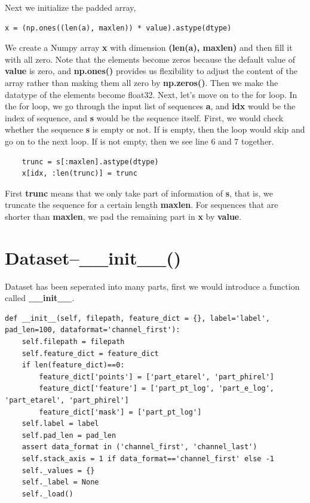 \documentclass[12pt]{report}
\numberwithin{equation}{section}
\begin{document}
Next we initialize the padded array,
\begin{lstlisting}
x = (np.ones((len(a), maxlen)) * value).astype(dtype)
\end{lstlisting}

We create a Numpy array \textbf{x} with dimension \textbf{(len(a), maxlen)} and then fill it with all zero. 
Note that the elements become zeros because the default value of \textbf{value} is zero, and \textbf{np.ones()} provides us flexibility to adjust the content of the array rather than making them all zero by \textbf{np.zeros()}.
Then we make the datatype of the elements become float32.
Next, let's move on to the for loop.
In the for loop, we go through the input list of sequences \textbf{a}, and \textbf{idx} would be the index of sequence, and \textbf{s} would be the sequence itself. First, we would check whether the sequence \textbf{s} is empty or not. If is empty, then the loop would skip and go on to the next loop. If is not empty, then we see line 6 and 7 together.

\begin{lstlisting}
    trunc = s[:maxlen].astype(dtype)
    x[idx, :len(trunc)] = trunc
\end{lstlisting}

First \textbf{trunc} means that we only take part of information of \textbf{s}, that is, we truncate the sequence for a certain length \textbf{maxlen}. For sequences that are shorter than \textbf{maxlen}, we pad the remaining part in \textbf{x} by \textbf{value}.

\section{Dataset--\_\_init\_\_()}

Dataset has been seperated into many parts, first we would introduce a function called \textbf{\_\_init\_\_}.

\begin{lstlisting}
def __init__(self, filepath, feature_dict = {}, label='label', pad_len=100, dataformat='channel_first'):
    self.filepath = filepath
    self.feature_dict = feature_dict
    if len(feature_dict)==0:
        feature_dict['points'] = ['part_etarel', 'part_phirel']
        feature_dict['feature'] = ['part_pt_log', 'part_e_log', 'part_etarel', 'part_phirel']
        feature_dict['mask'] = ['part_pt_log']
    self.label = label
    self.pad_len = pad_len
    assert data_format in ('channel_first', 'channel_last')
    self.stack_axis = 1 if data_format=='channel_first' else -1
    self._values = {}
    self._label = None
    self._load()
\end{lstlisting}
\end{document}
